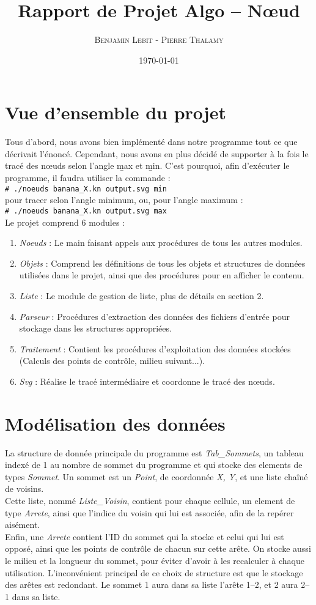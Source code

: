 \documentclass[12pt]{article}
\title{Rapport de Projet Algo -- Nœud}
\author{\textsc{Benjamin Lebit} - \textsc{Pierre Thalamy}}
\date{\today}
\newcommand{\shellcmd}[1]{\\\indent\indent\texttt{\footnotesize\# #1}\\}
\begin{document}
\maketitle

\section {Vue d'ensemble du projet}
Tous d'abord, nous avons bien implémenté dans notre programme tout ce
que décrivait l'énoncé. Cependant, nous avons en plus décidé de supporter à la
fois le tracé des nœuds selon l'angle \b{max} et \b{min}. C'est pourquoi, afin
d'exécuter le programme, il faudra utiliser la commande :
\shellcmd{./noeuds banana\_X.kn output.svg min} 
pour tracer selon l'angle minimum, ou, pour l'angle maximum :
\shellcmd{./noeuds banana\_X.kn output.svg max} 

Le projet comprend 6 modules :
\begin{enumerate}
\item \emph{Noeuds} : Le main faisant appels aux procédures de tous
  les autres modules.
\item \emph{Objets} : Comprend les définitions de tous les objets et
  structures de données utilisées dans le projet, ainsi que des
  procédures pour en afficher le contenu.
\item \emph{Liste} : Le module de gestion de liste, plus de détails en
  section 2.
\item \emph{Parseur} : Procédures d'extraction des données des fichiers
  d'entrée pour stockage dans les structures appropriées.
\item \emph{Traitement} : Contient les procédures d'exploitation des
  données stockées (Calculs des points de contrôle, milieu
  suivant...).
\item \emph{Svg} : Réalise le tracé intermédiaire et coordonne le tracé des nœuds.
\end{enumerate}

\section {Modélisation des données}
La structure de donnée principale du programme est \emph{Tab\_Sommets},
un tableau indexé de 1 au nombre de sommet du programme et qui stocke
des elements de types \emph{Sommet}. Un sommet est un \emph{Point}, de
coordonnée \emph{X, Y}, et une liste chaîné de voisins. \\
Cette liste, nommé \emph{Liste\_Voisin}, contient pour chaque cellule,
un element de type \emph{Arrete}, ainsi que l'indice du voisin qui lui
est associée, afin de la repérer aisément. \\
Enfin, une \emph{Arrete} contient l'ID du sommet qui la stocke et celui
qui lui est opposé, ainsi que les points de contrôle de chacun sur
cette arête. On stocke aussi le milieu et la longueur du sommet, pour
éviter d'avoir à les recalculer à chaque utilisation. L'inconvénient
principal de ce choix de structure est que le stockage des arêtes est
redondant. Le sommet 1 aura dans sa liste l'arête 1--2, et 2 aura
2--1 dans sa liste.
\end{document}
